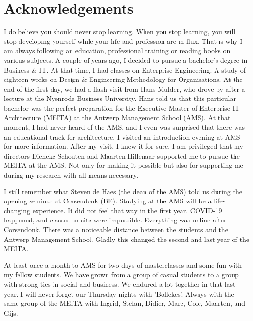 {}
\chapter*{Acknowledgements}
{\small%
	I do believe you should never stop learning. When you stop learning, you will stop developing yourself while your life and profession are in flux. That is why I am always following an education, professional training or reading books on various subjects. A couple of years ago, I decided to pursue a bachelor's degree in Business \& IT. At that time, I had classes on Enterprise Engineering. A study of eighteen weeks on Design \& Engineering Methodology for Organisations. At the end of the first day, we had a flash visit from Hans Mulder, who drove by after a lecture at the Nyenrode Business University. Hans told us that this particular bachelor was the perfect preparation for the Executive Master of Enterprise IT Architecture (MEITA) at the Antwerp Management School (AMS). At that moment, I had never heard of the AMS, and I even was surprised that there was an educational track for architecture. I visited an introduction evening at AMS for more information. After my visit, I knew it for sure. I am privileged that my directors Dieneke Schouten and Maarten Hillenaar supported me to pursue the MEITA at the AMS. Not only for making it possible but also for supporting me during my research with all means necessary.

	I still remember what Steven de Haes (the dean of the AMS) told us during the opening seminar at Corsendonk (BE). Studying at the AMS will be a life-changing experience. It did not feel that way in the first year. COVID-19 happened, and classes on-site were impossible. Everything was online after Corsendonk. There was a noticeable distance between the students and the Antwerp Management School. Gladly this changed the second and last year of the MEITA.
	
	At least once a month to AMS for two days of masterclasses and some fun with my fellow students. We have grown from a group of casual students to a group with strong ties in social and business. We endured a lot together in that last year. I will never forget our Thursday nights with 'Bollekes'. Always with the same group of the MEITA with Ingrid, Stefan, Didier, Marc, Cole, Maarten, and Gijs.
	
}

